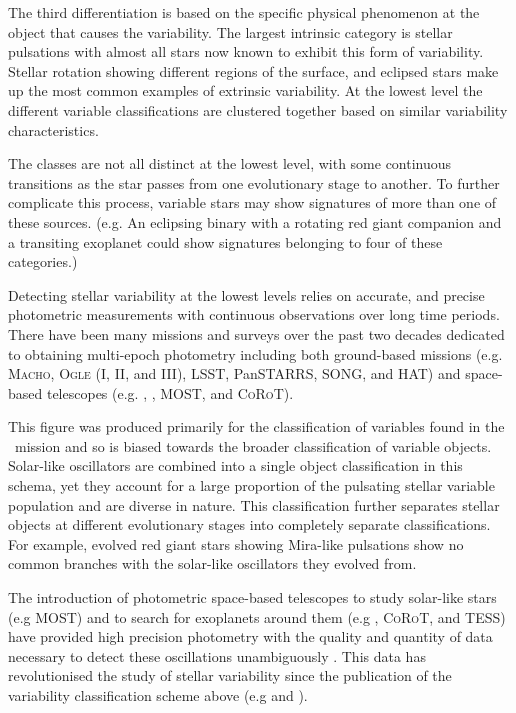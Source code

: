 The third differentiation is based on the specific physical phenomenon at the object that causes the variability. The largest intrinsic category is stellar pulsations with almost all stars now known to exhibit this form of variability. Stellar rotation showing different regions of the surface, and eclipsed stars make up the most common examples of extrinsic variability. At the lowest level the different variable classifications are clustered together based on similar variability characteristics.

The classes are not all distinct at the lowest level, with some continuous transitions as the star passes from one evolutionary stage to another. To further complicate this process, variable stars may show signatures of more than one of these sources. (e.g. An eclipsing binary with a rotating red giant companion and a transiting exoplanet could show signatures belonging to four of these categories.) 

Detecting stellar variability at the lowest levels relies on accurate, and precise photometric measurements with continuous observations over long time periods.
There have been many missions and surveys over the past two decades dedicated to obtaining multi-epoch photometry including both ground-based missions (e.g. \textsc{Macho}, \textsc{Ogle} (I, II, and III), LSST, PanSTARRS, SONG, and HAT) and space-based telescopes (e.g. \Kepler, \Gaia, MOST, and \textsc{CoRoT}).

This figure was produced primarily for the classification of variables found in the \Gaia~mission and so is biased towards the broader classification of variable objects. Solar-like oscillators are combined into a single object classification in this schema, yet they account for a large proportion of the pulsating stellar variable population and are diverse in nature. This classification further separates stellar objects at different evolutionary stages into completely separate classifications. For example, evolved red giant stars showing Mira-like pulsations show no common branches with the solar-like oscillators they evolved from.

The introduction of photometric space-based telescopes to study solar-like stars (e.g MOST) and to search for exoplanets around them (e.g \Kepler, \textsc{CoRoT}, and TESS) have provided high precision photometry with the quality and quantity of data necessary to detect these oscillations unambiguously \citep{stello_detection_2010}. This data has revolutionised the study of stellar variability since the publication of the variability classification scheme above (e.g \citet{chaplin_asteroseismic_2010}  and \citet{basu_determination_2010}). 



